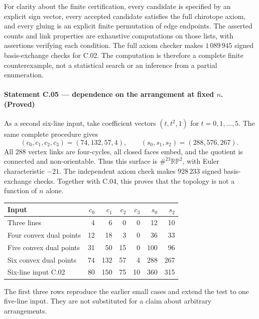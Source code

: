 \documentclass[11pt,a4paper]{article}
\begin{document}
For clarity about the finite certification, every candidate is
specified by an explicit sign vector, every accepted candidate
satisfies the full chirotope axiom, and every gluing is an explicit
finite permutation of edge endpoints. The asserted counts and
link properties are exhaustive computations on those lists, with
assertions verifying each condition. The full axiom checker makes
$1\,089\,945$ signed basis-exchange checks for C.02. The computation
is therefore a complete finite counterexample, not a statistical
search or an inference from a partial enumeration.

\paragraph{Statement C.05 --- dependence on the arrangement at fixed $n$. (Proved)}\label{C.05}
As a second six-line input, take coefficient vectors
$(t,t^2,1)$ for $t=0,1,\ldots,5$. The same complete procedure gives
\[
 (c_0,c_1,c_2,c_3)=(74,132,57,4),\qquad
 (s_0,s_1,s_2)=(288,576,267).
\]
All $288$ vertex links are four-cycles, all closed faces embed,
and the quotient is connected and non-orientable. Thus this
surface is $\#^{23}\mathbb{RP}^2$, with Euler characteristic $-21$.
The independent axiom check makes $928\,233$ signed basis-exchange
checks. Together with C.04, this proves that the topology is not
a function of $n$ alone.

\begin{center}
\begin{tabular}{lrrrrrr}
\hline
Input & $c_0$ & $c_1$ & $c_2$ & $c_3$ & $s_0$ & $s_2$\\
\hline
Three lines & 4 & 6 & 0 & 0 & 12 & 10\\
Four convex dual points & 12 & 18 & 3 & 0 & 36 & 33\\
Five convex dual points & 31 & 50 & 15 & 0 & 100 & 96\\
Six convex dual points & 74 & 132 & 57 & 4 & 288 & 267\\
Six-line input C.02 & 80 & 150 & 75 & 10 & 360 & 315\\
\hline
\end{tabular}
\end{center}
The first three rows reproduce the earlier small cases and extend
the test to one five-line input. They are not substituted for a
claim about arbitrary arrangements.
\end{document}
